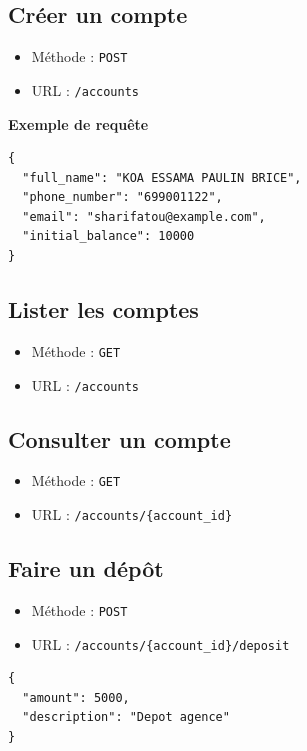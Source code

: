 \documentclass[12pt,a4paper]{article}
\begin{document}
\subsection{Créer un compte}

\begin{itemize}
    \item Méthode : \texttt{POST}
    \item URL : \texttt{/accounts}
\end{itemize}

\textbf{Exemple de requête}

\begin{verbatim}
{
  "full_name": "KOA ESSAMA PAULIN BRICE",
  "phone_number": "699001122",
  "email": "sharifatou@example.com",
  "initial_balance": 10000
}
\end{verbatim}

\subsection{Lister les comptes}

\begin{itemize}
    \item Méthode : \texttt{GET}
    \item URL : \texttt{/accounts}
\end{itemize}

\subsection{Consulter un compte}

\begin{itemize}
    \item Méthode : \texttt{GET}
    \item URL : \texttt{/accounts/\{account\_id\}}
\end{itemize}

\subsection{Faire un dépôt}

\begin{itemize}
    \item Méthode : \texttt{POST}
    \item URL : \texttt{/accounts/\{account\_id\}/deposit}
\end{itemize}

\begin{verbatim}
{
  "amount": 5000,
  "description": "Depot agence"
}
\end{verbatim}
\end{document}
